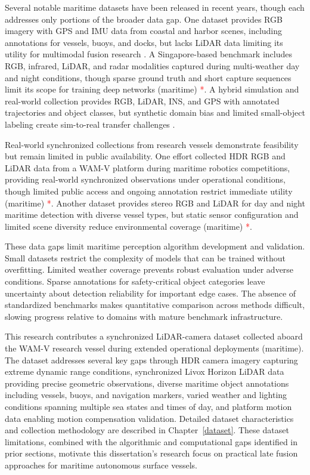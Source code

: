 \documentclass[../main.tex]{subfiles}
\begin{document}
Several notable maritime datasets have been released in recent years, though each addresses only portions of the broader data gap. One dataset provides RGB imagery with GPS and IMU data from coastal and harbor scenes, including annotations for vessels, buoys, and docks, but lacks LiDAR data limiting its utility for multimodal fusion research \cite{su2023}. A Singapore-based benchmark includes RGB, infrared, LiDAR, and radar modalities captured during multi-weather day and night conditions, though sparse ground truth and short capture sequences limit its scope for training deep networks (maritime) \textcolor{red}{*}. A hybrid simulation and real-world collection provides RGB, LiDAR, INS, and GPS with annotated trajectories and object classes, but synthetic domain bias and limited small-object labeling create sim-to-real transfer challenges \cite{huang2025}.

Real-world synchronized collections from research vessels demonstrate feasibility but remain limited in public availability. One effort collected HDR RGB and LiDAR data from a WAM-V platform during maritime robotics competitions, providing real-world synchronized observations under operational conditions, though limited public access and ongoing annotation restrict immediate utility (maritime) \textcolor{red}{*}. Another dataset provides stereo RGB and LiDAR for day and night maritime detection with diverse vessel types, but static sensor configuration and limited scene diversity reduce environmental coverage (maritime) \textcolor{red}{*}.

These data gaps limit maritime perception algorithm development and validation. Small datasets restrict the complexity of models that can be trained without overfitting. Limited weather coverage prevents robust evaluation under adverse conditions. Sparse annotations for safety-critical object categories leave uncertainty about detection reliability for important edge cases. The absence of standardized benchmarks makes quantitative comparison across methods difficult, slowing progress relative to domains with mature benchmark infrastructure.

This research contributes a synchronized LiDAR-camera dataset collected aboard the WAM-V research vessel during extended operational deployments (maritime). The dataset addresses several key gaps through HDR camera imagery capturing extreme dynamic range conditions, synchronized Livox Horizon LiDAR data providing precise geometric observations, diverse maritime object annotations including vessels, buoys, and navigation markers, varied weather and lighting conditions spanning multiple sea states and times of day, and platform motion data enabling motion compensation validation. Detailed dataset characteristics and collection methodology are described in Chapter~\ref{dataset}. These dataset limitations, combined with the algorithmic and computational gaps identified in prior sections, motivate this dissertation's research focus on practical late fusion approaches for maritime autonomous surface vessels.
\end{document}
